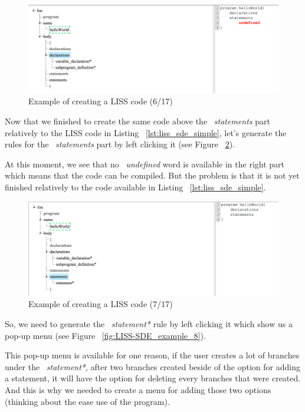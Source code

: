 \documentclass[
  oneside,
  11pt, a4paper,
  footinclude=true,
  headinclude=true,
  cleardoublepage=empty
]{scrbook}
\begin{document}
\begin{figure}[h!]
  \centering
    \includegraphics[width=1\textwidth]{img/LISS-SDE_creating_program/LISS-SDE6.png}
    \caption{Example of creating a LISS code (6/17)}
    \label{fig:LISS-SDE_example_6}
\end{figure}

Now that we finished to create the same code above the ~\textit{statements} part relatively to the LISS code in Listing ~\ref{lst:liss_sde_simple}, let's generate the rules for the ~\textit{statements} part by left clicking it (see Figure ~\ref{fig:LISS-SDE_example_7}).

At this moment, we see that no ~\textit{undefined} word is available in the right part which means that the code can be compiled. But the problem is that it is not yet finished relatively to the code available in Listing ~\ref{lst:liss_sde_simple}.

\begin{figure}[h!]
  \centering
    \includegraphics[width=1\textwidth]{img/LISS-SDE_creating_program/LISS-SDE7.png}
    \caption{Example of creating a LISS code (7/17)}
    \label{fig:LISS-SDE_example_7}
\end{figure}

So, we need to generate the ~\textit{statement*} rule by left clicking it which show us a pop-up menu (see Figure ~\ref{fig:LISS-SDE_example_8}).

This pop-up menu is available for one reason, if the user creates a lot of branches under the ~\textit{statement*}, after two branches created beside of the option for adding a statement, it will have the option for deleting every branches that were created. And this is why we needed to create a menu for adding those two options (thinking about the ease use of the program).
\end{document}

